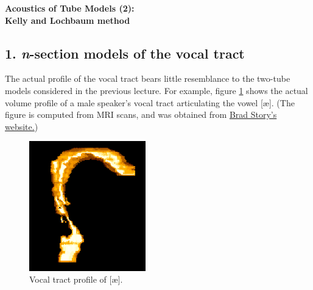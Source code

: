 

{}
\thispagestyle{empty}

{\LARGE \textbf{Acoustics of Tube Models (2):\\ Kelly and Lochbaum method}}\label{atm}

\subsection*{1. \textit{n}-section models of the vocal tract}

The actual profile of the vocal tract bears little resemblance to the two-tube models considered in the previous lecture. For example, figure \ref{f1} shows the actual volume profile of a male speaker's vocal tract articulating the vowel {[}\ae {]}. (The figure is computed from MRI scans, and was obtained from \href{https://slhs.arizona.edu/person/brad-story-phd}{Brad Story's website.})

\captionsetup[figure]{list=no}
\setcounter{figure}{0}
\makeatletter 
\renewcommand{\thefigure}{\@arabic\c@figure}
\makeatother

\begin{figure}[htbp]
\begin{center}
\includegraphics[width=0.45\textwidth]{mp/img/male-ae.png}
\caption{Vocal tract profile of {[}\ae {]}.}
\label{f1}
\end{center}
\end{figure}


